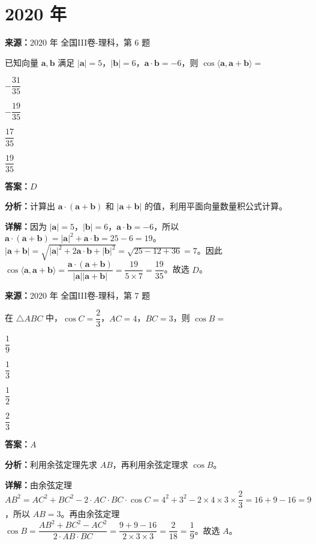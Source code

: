 \section*{2020 年}

\begin{question}[points=5]
\textbf{来源：}2020 年 全国III卷-理科，第 6 题\par
已知向量 $\mathbf{a},\mathbf{b}$ 满足 $|\mathbf{a}|=5$，$|\mathbf{b}|=6$，$\mathbf{a}\cdot\mathbf{b}=-6$，则 $\cos\langle\mathbf{a},\mathbf{a}+\mathbf{b}\rangle=$
\begin{choices}
  \item $-\dfrac{31}{35}$
  \item $-\dfrac{19}{35}$
  \item $\dfrac{17}{35}$
  \item $\dfrac{19}{35}$
\end{choices}
\begin{solution}
\textbf{答案：}$D$

\textbf{分析：}计算出 $\mathbf{a}\cdot(\mathbf{a}+\mathbf{b})$ 和 $|\mathbf{a}+\mathbf{b}|$ 的值，利用平面向量数量积公式计算。

\textbf{详解：}因为 $|\mathbf{a}|=5$，$|\mathbf{b}|=6$，$\mathbf{a}\cdot\mathbf{b}=-6$，所以 $\mathbf{a}\cdot(\mathbf{a}+\mathbf{b})=|\mathbf{a}|^2+\mathbf{a}\cdot\mathbf{b}=25-6=19$。$|\mathbf{a}+\mathbf{b}|=\sqrt{|\mathbf{a}|^2+2\mathbf{a}\cdot\mathbf{b}+|\mathbf{b}|^2}=\sqrt{25-12+36}=7$。因此 $\cos\langle\mathbf{a},\mathbf{a}+\mathbf{b}\rangle=\dfrac{\mathbf{a}\cdot(\mathbf{a}+\mathbf{b})}{|\mathbf{a}||\mathbf{a}+\mathbf{b}|}=\dfrac{19}{5\times7}=\dfrac{19}{35}$。故选 $D$。
\end{solution}
\end{question}

\begin{question}[points=5]
\textbf{来源：}2020 年 全国III卷-理科，第 7 题\par
在 $\triangle ABC$ 中，$\cos C=\dfrac{2}{3}$，$AC=4$，$BC=3$，则 $\cos B=$
\begin{choices}
  \item $\dfrac{1}{9}$
  \item $\dfrac{1}{3}$
  \item $\dfrac{1}{2}$
  \item $\dfrac{2}{3}$
\end{choices}
\begin{solution}
\textbf{答案：}$A$

\textbf{分析：}利用余弦定理先求 $AB$，再利用余弦定理求 $\cos B$。

\textbf{详解：}由余弦定理 $AB^2=AC^2+BC^2-2\cdot AC\cdot BC\cdot\cos C=4^2+3^2-2\times4\times3\times\dfrac{2}{3}=16+9-16=9$，所以 $AB=3$。再由余弦定理 $\cos B=\dfrac{AB^2+BC^2-AC^2}{2\cdot AB\cdot BC}=\dfrac{9+9-16}{2\times3\times3}=\dfrac{2}{18}=\dfrac{1}{9}$。故选 $A$。
\end{solution}
\end{question}

